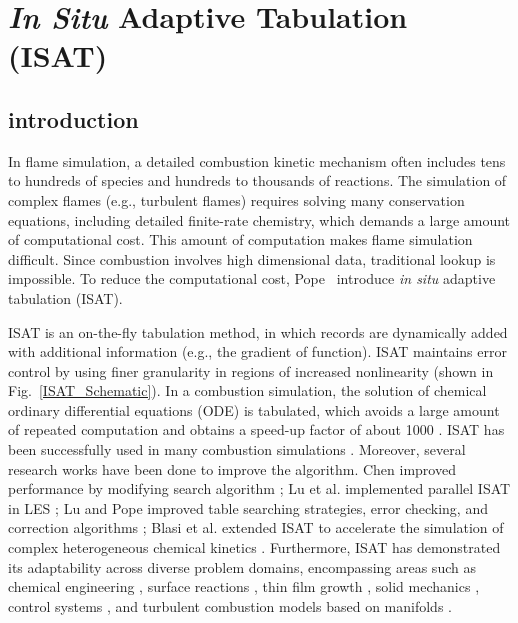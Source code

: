 \section{\textit{In Situ} Adaptive Tabulation (ISAT)}
\label{sec:ISAT}
\subsection{introduction}
In flame simulation, a detailed combustion kinetic mechanism often includes tens to hundreds of species and hundreds to thousands of reactions. The simulation of complex flames (e.g., turbulent flames) requires solving many conservation equations, including detailed finite-rate chemistry, which demands a large amount of computational cost. This amount of computation makes flame simulation difficult. Since combustion involves high dimensional data, traditional lookup is impossible. To reduce the computational cost, Pope~\cite{pope1997computationally} introduce \textit{in situ} adaptive tabulation (ISAT).

ISAT is an on-the-fly tabulation method, in which records are dynamically added with additional information (e.g., the gradient of function). ISAT maintains error control by using finer granularity in regions of increased nonlinearity (shown in Fig.~\ref{ISAT_Schematic}). In a combustion simulation, the solution of chemical ordinary differential equations (ODE) is tabulated, which avoids a large amount of repeated computation and obtains a speed-up factor of about 1000 \cite{pope1997computationally}. ISAT has been successfully used in many combustion simulations \cite{pope1997computationally,gordon2007numerical,wang2003application,singer2006modeling,singer2004exploiting,tang2002implementation}. Moreover, several research works have been done to improve the algorithm. Chen improved performance by modifying search algorithm \cite{chen2004analysis}; Lu et al. implemented parallel ISAT in LES \cite{lu2005investigation}; Lu and Pope improved table searching strategies, error checking, and correction algorithms \cite{lu2009improved}; Blasi et al. extended ISAT to accelerate the simulation of complex heterogeneous chemical kinetics \cite{blasi2016situ}. Furthermore, ISAT has demonstrated its adaptability across diverse problem domains, encompassing areas such as chemical engineering \cite{shah1999computational,kolhapure2005pdf,10.1115/1.2709655}, surface reactions \cite{mazumder2005adaptation}, thin film growth \cite{varshney2005multiscale}, solid mechanics \cite{arsenlis2006generalized}, control systems \cite{hedengren2008approximate}, and turbulent combustion models based on manifolds \cite{lacey2021situ}.


